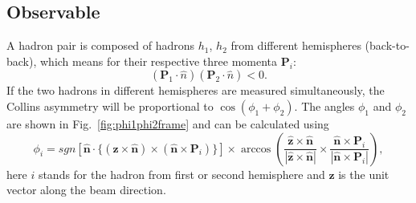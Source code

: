 
\subsection{Observable}
\label{sec:observable}
A hadron pair is composed of hadrons $h_1$, $h_2$ from different hemispheres (back-to-back), which means for their respective three momenta $\boldsymbol{P}_{i}$:
\begin{equation}
(\boldsymbol{P}_{1} \cdot \hat{n})(\boldsymbol{P}_{2}\cdot \hat{n}) < 0 .
\end{equation}
If the two hadrons in different hemispheres are measured simultaneously, the Collins asymmetry will be proportional to $\cos(\phi_1+\phi_2)$. The angles $\phi_1$ and $\phi_2$ are shown in Fig.~\ref{fig:phi1phi2frame} and can be calculated using
\begin{equation}
\phi_i=sgn[\hat{\boldsymbol{n}}\cdot \{ (\boldsymbol{z}\times\hat{\boldsymbol{n}})\times(\hat{\boldsymbol{n}}\times{\boldsymbol{P}_{i}})\}]\times \arccos(\frac{\hat{\boldsymbol{z}}\times\hat{\boldsymbol{n}}}{|\hat{\boldsymbol{z}}\times\hat{\boldsymbol{n}}|}\times\frac{\hat{\boldsymbol{n}}\times{\boldsymbol{P}_{i}}}{|\hat{\boldsymbol{n}}\times{\boldsymbol{P}_{i}}|}),
\label{eqn:collinsangledefine2}
\end{equation}
here $i$ stands for the hadron from first or second hemisphere and $\boldsymbol{z}$ is the unit vector along the beam direction.

